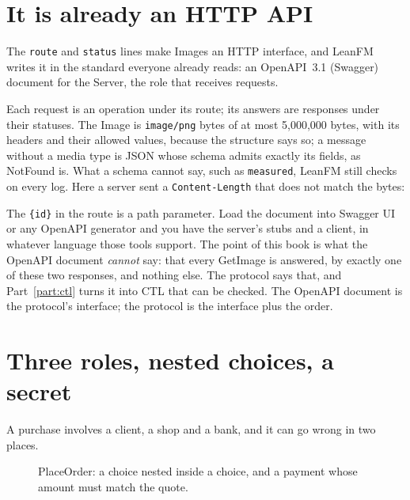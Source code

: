 \section{It is already an HTTP API}\label{sec:openapi}

The \texttt{route} and \texttt{status} lines make Images an HTTP interface, and LeanFM
writes it in the standard everyone already reads: an OpenAPI~3.1 (Swagger) document
for the Server, the role that receives requests.


Each request is an operation under its route; its answers are responses under their
statuses. The Image is \texttt{image/png} bytes of at most 5{,}000{,}000 bytes, with
its headers and their allowed values, because the structure says so; a message without
a media type is JSON whose schema admits exactly its fields, as NotFound is. What a
schema cannot say, such as \texttt{measured}, LeanFM still checks on every log. Here a
server sent a \texttt{Content-Length} that does not match the bytes:



The \texttt{\{id\}} in the route is a path parameter. Load the document into Swagger UI
or any OpenAPI generator and you have the server's stubs and a client, in whatever
language those tools support. The point of this book is what the OpenAPI document
\emph{cannot} say: that every GetImage is answered, by exactly one of these two
responses, and nothing else. The protocol says that, and Part~\ref{part:ctl} turns it
into CTL that can be checked. The OpenAPI document is the protocol's interface; the
protocol is the interface plus the order.

\section{Three roles, nested choices, a secret}

A purchase involves a client, a shop and a bank, and it can go wrong in two places.



\begin{figure}[ht]
\centering
{}
\caption{PlaceOrder: a choice nested inside a choice, and a payment whose amount must match the quote.}
\label{fig:placeorder}
\end{figure}


